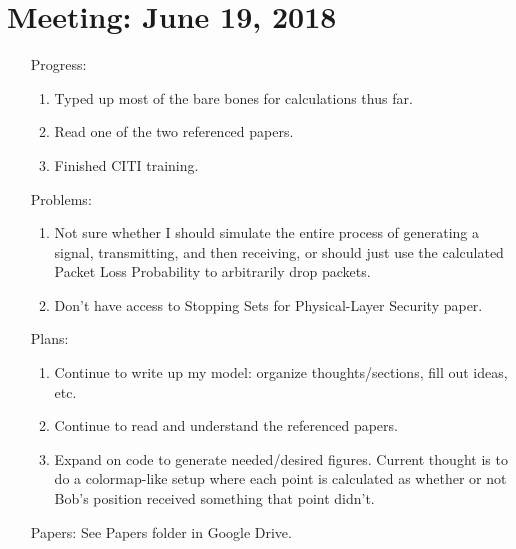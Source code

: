 \documentclass[11pt]{article}
\begin{document}
\section{Meeting: June 19, 2018}
\begin{itemize}
\item[Progress:]
\begin{enumerate}
\item Typed up most of the bare bones for calculations thus far.
\item Read one of the two referenced papers.
\item Finished CITI training.
\end{enumerate}

\item[Problems:]
\begin{enumerate}
\item Not sure whether I should simulate the entire process of generating a signal, transmitting, and then receiving, or should just use the calculated Packet Loss Probability to arbitrarily drop packets.
\item Don't have access to Stopping Sets for Physical-Layer Security paper.
\end{enumerate}

\item[Plans:]
\begin{enumerate}
\item Continue to write up my model: organize thoughts/sections, fill out ideas, etc.
\item Continue to read and understand the referenced papers.
\item Expand on code to generate needed/desired figures.  Current thought is to do a colormap-like setup where each point is calculated as whether or not Bob's position received something that point didn't.
\end{enumerate}

\item[Papers:]
See Papers folder in Google Drive.

\end{itemize}\newpage
\end{document}
